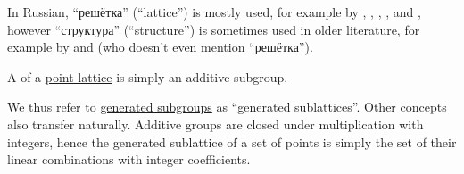 \begin{remark}
\begin{itemize}
    In Russian, \enquote{решётка} (\enquote{lattice}) is mostly used, for example by
    ,
    ,
    ,
    ,
     and
    ,
    however \enquote{структура} (\enquote{structure}) is sometimes used in older literature, for example by
     and
     (who doesn't even mention \enquote{решётка}).
  \end{itemize}
\end{remark}

\begin{definition}\label{def:point_sublattice}\mimprovised
  A  of a \hyperref[def:point_lattice]{point lattice} is simply an additive subgroup.
\end{definition}
\begin{comments}
  \item We thus refer to \hyperref[def:group/generated]{generated subgroups} as \enquote{generated sublattices}. Other concepts also transfer naturally. Additive groups are closed under multiplication with integers, hence the generated sublattice of a set of points is simply the set of their linear combinations with integer coefficients.
\end{comments}

